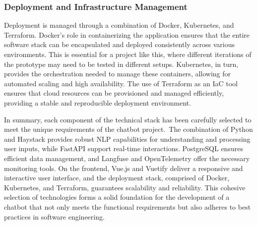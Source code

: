 \subsubsection{Deployment and Infrastructure Management}

Deployment is managed through a combination of Docker, Kubernetes, and Terraform.
Docker’s role in containerizing the application ensures that the entire software stack can be encapsulated and deployed
consistently across various environments.\autocite[cf.][p. 191]{openjaStudyingPracticesDeploying2022} This is essential
for a project like this, where different iterations of the prototype may need to be tested in different setups.
Kubernetes, in turn, provides the orchestration needed to manage these containers, allowing for automated scaling and
high availability.\autocite[cf.][pp. 2,7-8]{carrionKubernetesSchedulingTaxonomy2022} The use of Terraform as an \ac{IaC}
tool ensures that cloud resources can be provisioned and managed efficiently, providing a stable and reproducible
deployment environment.\autocite[cf.][p. 24]{n.EvaluatingDevopsTools2023}

\vspace{1cm}

In summary, each component of the technical stack has been carefully selected to meet the unique requirements of the
chatbot project.\ The combination of Python and Haystack provides robust NLP capabilities for understanding and
processing user inputs, while FastAPI support real-time interactions. PostgreSQL ensures efficient data management,
and Langfuse and OpenTelemetry offer the necessary monitoring tools. On the frontend, Vue.js and Vuetify deliver a
responsive and interactive user interface, and the deployment stack, comprised of Docker, Kubernetes, and Terraform,
guarantees scalability and reliability. This cohesive selection of technologies forms a solid foundation for the
development of a chatbot that not only meets the functional requirements but also adheres to best practices in software
engineering.
